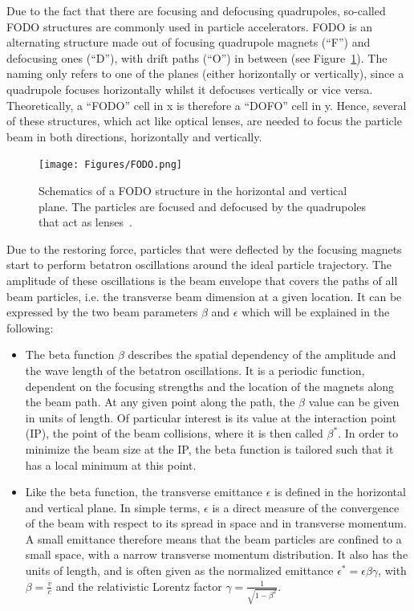Due to the fact that there are focusing and defocusing quadrupoles, so-called FODO structures are commonly used in particle accelerators.
FODO is an alternating structure made out of focusing quadrupole magnets (``F'') and defocusing ones (``D''), with drift paths (``O'') in between (see Figure~\ref{fig:FODO}). 
The naming only refers to one of the planes (either horizontally or vertically), since a quadrupole focuses horizontally whilst it defocuses vertically or vice versa.
Theoretically, a ``FODO'' cell in x is therefore a ``DOFO'' cell in y.
Hence, several of these structures, which act like optical lenses, are needed to focus the particle beam in both directions, horizontally and vertically.
\begin{figure}
\centering
\texttt{[image: Figures/FODO.png]}
\caption[Schematic of a FODO structure]{Schematics of a FODO structure in the horizontal and vertical plane. The particles are focused and defocused by the quadrupoles that act as lenses~\cite[p. 65]{Hinterberger}.}
\label{fig:FODO}
\end{figure}
Due to the restoring force, particles that were deflected by the focusing magnets start to perform betatron oscillations around the ideal particle trajectory.
The amplitude of these oscillations is the beam envelope that covers the paths of all beam particles, i.e. the transverse beam dimension at a given location.
It can be expressed by the two beam parameters $\beta$ and $\epsilon$ which will be explained in the following:
\begin{itemize}
 \item The beta function $\beta$ describes the spatial dependency of the amplitude and the wave length of the betatron oscillations.
It is a periodic function, dependent on the focusing strengths and the location of the magnets along the beam path.
At any given point along the path, the $\beta$ value can be given in units of length.
Of particular interest is its value at the interaction point (IP), the point of the beam collisions, where it is then called $\beta^*$.
In order to minimize the beam size at the IP, the beta function is tailored such that it has a local minimum at this point.  
\item Like the beta function, the transverse emittance $\epsilon$ is defined in the horizontal and vertical plane.
In simple terms, $\epsilon$ is a direct measure of the convergence of the beam with respect to its spread in space and in transverse momentum.
A small emittance therefore means that the beam particles are confined to a small space, with a narrow transverse momentum distribution.
It also has the units of length, and is often given as the normalized emittance $\epsilon^* = \epsilon\beta\gamma$, with $\beta=\frac{v}{c}$ and the relativistic Lorentz factor $\gamma=\frac{1}{\sqrt{1-\beta^2}}$.
\end{itemize}
